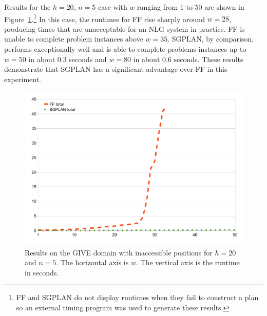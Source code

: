 Results for the $h=20$, $n=5$ case with $w$ ranging from 1 to 50 are shown
in Figure~\ref{fig:give-runtime-nosoln}.\footnote{FF and SGPLAN do
 not display runtimes when they fail to construct a plan so an external timing
 program was used to generate these results.}
In this case, the runtimes for FF rise sharply around $w=28$, producing
times that are unacceptable for an NLG system in practice. FF is unable
to complete problem instances above $w=35$. SGPLAN, by comparison, performs
exceptionally well and is able to complete problems instances up to $w=50$
in about 0.3 seconds and $w=80$ in about 0.6 seconds. These results
demonstrate that SGPLAN has a significant advantage over FF in this
experiment. 

\begin{figure}
  \centering
  \includegraphics[width=0.85\columnwidth]{graph-exp4}
  \caption{Results on the GIVE domain with inaccessible
    positions for $h=20$ and $n=5$. The horizontal axis is $w$.
    The vertical axis is the runtime in seconds.}
  \label{fig:give-runtime-nosoln}
\end{figure}



